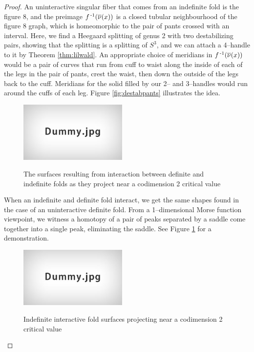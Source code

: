\begin{proof}
	An uninteractive singular fiber that comes from an indefinite fold is the figure 8, and the preimage $f^{\,\text{-}1}(\overline{\nu}(x))$ is a closed tubular neighbourhood of the figure 8 graph, which is homeomorphic to the pair of pants crossed with an interval.
	Here, we find a Heegaard splitting of genus 2 with two destabilizing pairs, showing that the splitting is a splitting of $S^3$, and we can attach a 4--handle to it by Theorem \ref{thm:lilwald}.
	An appropriate choice of meridians in $f^{\,\text{-}1}(\overline{\nu}(x))$ would be a pair of curves that run from cuff to waist along the inside of each of the legs in the pair of pants, crest the waist, then down the outside of the legs back to the cuff.
	Meridians for the solid filled by our 2-- and 3--handles would run around the cuffs of each leg.
	Figure \ref{fig:destabpants} illustrates the idea.
	
	\begin{figure}
		\centering
		\captionsetup{justification=centering}
		\caption{The surfaces resulting from interaction between definite and indefinite folds as they project near a codimension 2 critical value}
		\includegraphics[height=3cm]{figures/dummy.jpg}
		\label{fig:defindefconn}
	\end{figure}
	
	When an indefinite and definite fold interact, we get the same shapes found in the case of an uninteractive definite fold.
	From a 1--dimensional Morse function viewpoint, we witness a homotopy of a pair of peaks separated by a saddle come together into a single peak, eliminating the saddle.
	See Figure \ref{fig:defindefconn} for a demonstration.

	\begin{figure}
		\centering
		\caption{Indefinite interactive fold surfaces projecting near a codimension 2 critical value}
		\includegraphics[height=3cm]{figures/dummy.jpg}
		\label{fig:interactivefoldprojcodim2}		
	\end{figure}
	

\end{proof}
